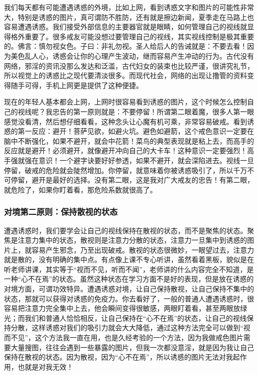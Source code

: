 \documentclass{ctexart}
\begin{document}
我们每天都有可能遭遇诱惑的外境，比如上网，看到诱惑文字和图片的可能性非常大，特别是诱惑的图片，真可谓防不胜防，还有就是擦边新闻，夏季走在马路上也容易遭遇诱惑。我们接受外部信息的主要器官就是眼睛，如何管理自己的视线就显得格外重要了。很多戒友可能没想过要管理自己的视线，其实视线控制是极其重要的。佛言：慎勿视女色。子曰：非礼勿视。圣人给后人的告诫就是：不要去看！因为美色乱人心，诱惑会让你的心理产生波动，继而容易产生冲动的行为。古代没有网络，邪淫的资讯没那么发达和泛滥，古代妇女的装束也比较严谨，很讲究礼节，所以视觉上的诱惑比之现代要清淡很多。而现代社会，网络的出现让撸管的资料变得随手可得，手机上网更是提供了这种便捷。

现在的年轻人基本都会上网，上网时很容易看到诱惑的图片，这个时候怎么控制自己的视线呢？我忠告的第一原则就是：不要停留！所谓第二眼着魔，很多人第一眼感觉没看清，然后想仔细看看，这种念头让心魔有机可乘，非常容易破戒。看到诱惑的第一反应：避开！菩萨见欲，如避火坑。避色如避箭，这个戒色意识一定要在脑中不断强化，如果不避开，就会中花箭！菜鸟的典型表现就是粘上去，而高手的反应就是避开！必须避开，就像避开冲向自己的大卡车！这种意识一定要强烈！高手强就强在意识！一个避字诀要好好参透，如果不避开，就会深陷进去。视线一旦停留，破戒的危险就会陡然增加。你停留，就意味着你被诱惑吸引了，所以千万不可停留，避开是最好的选择。没有第二眼，这是我对广大戒友的忠告！有第二眼，就危险了，如果你盯着看，那危险系数就很高了。

\subsubsection{对境第二原则：保持散视的状态}

遭遇诱惑时，我们要学会让自己的视线保持在散视的状态，而不是聚焦的状态。聚焦是注意力集中的状态，散视则是注意力分散的状态，注意力一旦集中到诱惑的图片上，就容易产生邪念，乃至出现破戒。散视的状态很微妙，一眼望过去，注意力就是散的，没有明确的集中点。有点像上课不专心听讲，虽然看着黑板，貌似是在听老师讲课，其实等于“视而不见，听而不闻”，老师讲的什么内容完全不知道，是一种“心不在焉”的状态。虽然这种状态在学习方面不是好的表现，但是放在诱惑的对境方面，可谓功效特异。遭遇诱惑对境，让自己保持散视，让自己保持不集中的状态，那就可以获得对诱惑的免疫力。你去看好了，一般的普通人遭遇诱惑时，很容易把注意力完全集中上去，他会瞬间变得很敏感，两眼盯着看，甚至两眼放绿光；而我们和普通人恰恰相反，让自己保持在“心不在焉”的状态，让自己的视线保持分散，这样诱惑对我们的吸引力就会大大降低，通过这种方法完全可以做到“视而不见”，这个方法我一直在用，也是久经考验的一个方法，因为我做戒色图片需要大量搜图，往往会遇到一些暴露的图片，但我一次都没意淫，就是因为我让自己保持在散视的状态。因为散视，因为“心不在焉”，所以诱惑的图片无法对我起作用，也就是对我无效！
\end{document}
